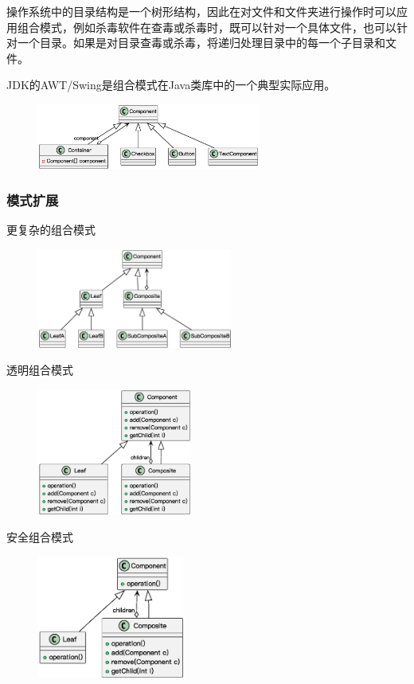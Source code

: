  操作系统中的目录结构是一个树形结构，因此在对文件和文件夹进行操作时可以应用组合模式，例如杀毒软件在查毒或杀毒时，既可以针对一个具体文件，也可以针对一个目录。如果是对目录查毒或杀毒，将递归处理目录中的每一个子目录和文件。

 JDK的AWT/Swing是组合模式在Java类库中的一个典型实际应用。
\begin{figure}[H]
    \vspace{-0.5em}
	\centering
	\includegraphics[width=0.65\textwidth]{images/组合模式应用3.eps}
    \vspace{-1em}
\end{figure}

\subsubsection{模式扩展}
更复杂的组合模式
\begin{figure}[H]
    \vspace{-0.5em}
	\centering
	\includegraphics[width=0.57\textwidth]{images/更复杂的组合模式.eps}
    \vspace{-1em}
\end{figure}

透明组合模式
\begin{figure}[H]
    \vspace{-0.5em}
	\centering
	\includegraphics[width=0.45\textwidth]{images/透明组合模式.eps}
    \vspace{-1em}
\end{figure}

安全组合模式
\begin{figure}[H]
    \vspace{-0.5em}
	\centering
	\includegraphics[width=0.43\textwidth]{images/安全组合模式.eps}
    \vspace{-1em}
\end{figure}

